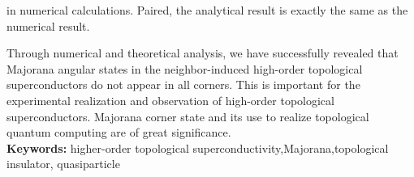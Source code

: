 in numerical calculations. Paired, the analytical result is exactly the same as the numerical result.
 
  Through numerical and theoretical analysis, we have successfully revealed that Majorana angular states in the neighbor-induced high-order topological superconductors do not appear in all corners. This is important for the experimental realization and observation of high-order topological superconductors. Majorana corner state and its use to realize topological quantum computing are of great significance.\\
\noindent\textbf{ Keywords:} higher-order topological superconductivity,Majorana,topological insulator,
quasiparticle
